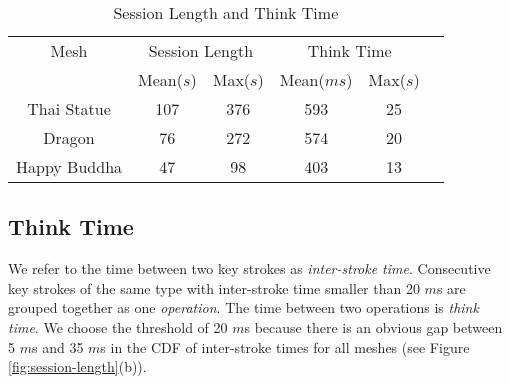 \begin{table}[hbp!]
\begin{center}
\begin{tabular}{|c|c|c|c|c|c|}
\hline 
Mesh&\multicolumn{2}{c|}{Session Length}&\multicolumn{2}{c|}{Think Time}\\
\cline{2-5}
&Mean($s$)&Max($s$)&Mean($ms$)&Max($s$)\\
\hline
Thai Statue&107&376&593&25\\
\hline
Dragon&76&272&574&20\\
\hline
Happy Buddha&47&98&403&13\\
\hline
\end{tabular}
\caption{Session Length and Think Time\label{t:TimeTable}}
\end{center}
\end{table}%

\subsection{Think Time}
We refer to the time between two key strokes as \textit{inter-stroke time}. 
Consecutive key strokes of the same type with inter-stroke time smaller than 20 $m$s
are grouped together as one \textit{operation}. 
The time between two operations is \textit{think time}. 
We choose the threshold of 20 $m$s because there is an obvious gap between 5 $m$s and 35 $m$s
in the CDF of inter-stroke times for all meshes (see Figure \ref{fig:session-length}(b)).

 
